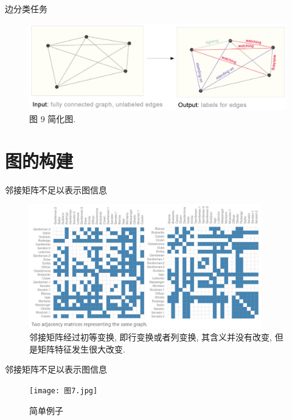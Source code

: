 \documentclass{beamer}
\begin{document}
\begin{frame}{边分类任务}
    \begin{figure}
        \includegraphics[width=\textwidth]{边分类2.jpg}
        \caption{图 9 简化图. }
    \end{figure}
\end{frame}

\section{图的构建}

\begin{frame}{邻接矩阵不足以表示图信息}
    \begin{figure}
        \includegraphics[width=0.9\textwidth]{邻接矩阵.jpg}
        \caption{邻接矩阵经过初等变换, 即行变换或者列变换, 其含义并没有改变, 但是矩阵特征发生很大改变. }
    \end{figure}
\end{frame}

\begin{frame}{邻接矩阵不足以表示图信息}
    \begin{figure}
        \texttt{[image: 图7.jpg]}
        \caption{简单例子}
    \end{figure}
\end{frame}
\end{document}
